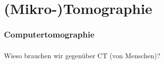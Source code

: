 \section{(Mikro-)Tomographie}
\begin{frame}
	\frametitle{Computertomographie}
	\centering
\end{frame}

\begin{frame}
	\frametitle{\uct}
	Wieso brauchen wir \uct gegenüber CT (von Menschen)?
\end{frame}

\begin{frame}
	\frametitle{\uct}
	\begin{columns}
		\begin{column}{0.49\linewidth}
			\centering
			
		\end{column}
		\begin{column}{0.49\linewidth}
			\centering
			\only<1>{}%
			\only<2|handout:0>{}%
			\only<3|handout:0>{}%
		\end{column}
	\end{columns}
\end{frame}

